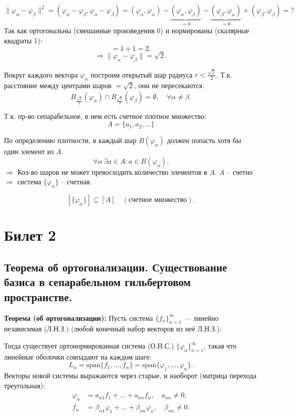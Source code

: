 \documentclass[12pt,a4paper,openany]{book}
\begin{document}
\[
\|\varphi_\alpha - \varphi_\beta\|^2 = (\varphi_\alpha - \varphi_\beta, \varphi_\alpha - \varphi_\beta) = (\varphi_\alpha, \varphi_\alpha) - \underbrace{(\varphi_\alpha, \varphi_\beta)}_{=0} - \underbrace{(\varphi_\beta, \varphi_\alpha)}_{=0} + (\varphi_\beta, \varphi_\beta) = ?
\]
Так как ортогональны (смешанные произведения 0) и нормированы (скалярные квадраты 1):
\[
= 1 + 1 = 2.
\]
\[
\Rightarrow \|\varphi_\alpha - \varphi_\beta\| = \sqrt{2}.
\]

Вокруг каждого вектора $\varphi_\alpha$ построим открытый шар радиуса $r < \frac{\sqrt{2}}{2}$.
Т.к. расстояние между центрами шаров $= \sqrt{2}$, они не пересекаются.
\[
B_{\frac{\sqrt{2}}{2}}(\varphi_\alpha) \cap B_{\frac{\sqrt{2}}{2}}(\varphi_\beta) = \emptyset, \quad \forall \alpha \neq \beta.
\]

Т.к. пр-во сепарабельное, в нем есть счетное плотное множество:
\[
A = \{a_1, a_2, \dots\}
\]

По определению плотности, в каждый шар $B(\varphi_\alpha)$ должен попасть хотя бы один элемент из $A$.
\[
\forall \alpha \ \exists a \in A : a \in B(\varphi_\alpha).
\]
$\Rightarrow$ Кол-во шаров не может превосходить количество элементов в $A$.
$A$ -- счетно $\Rightarrow$ система $\{\varphi_\alpha\}$ -- счетная.

\[
[\{\varphi_\alpha\}] \subseteq [A] \quad (\text{счетное множество}).
\]
\chapter{Билет 2 }


\section{Теорема об ортогонализации. Существование базиса в сепарабельном гильбертовом пространстве.}

\textbf{Теорема (об ортогонализации):}
Пусть система $\{f_n\}_{n=1}^\infty$ — линейно независимая (Л.Н.З.) (любой конечный набор векторов из неё Л.Н.З.).

Тогда существует ортонормированная система (О.Н.С.) $\{\varphi_n\}_{n=1}^\infty$, такая что линейные оболочки совпадают на каждом шаге:
\[
L_n = \text{span}\{f_1, \dots, f_n\} = \text{span}\{\varphi_1, \dots, \varphi_n\}.
\]
Векторы новой системы выражаются через старые, и наоборот (матрица перехода треугольная):
\begin{align*}
\varphi_n &= a_{n1} f_1 + \dots + a_{nn} f_n, \quad a_{nn} \neq 0, \\
f_n &= \beta_{n1} \varphi_1 + \dots + \beta_{nn} \varphi_n, \quad \beta_{nn} \neq 0.
\end{align*}
\end{document}
